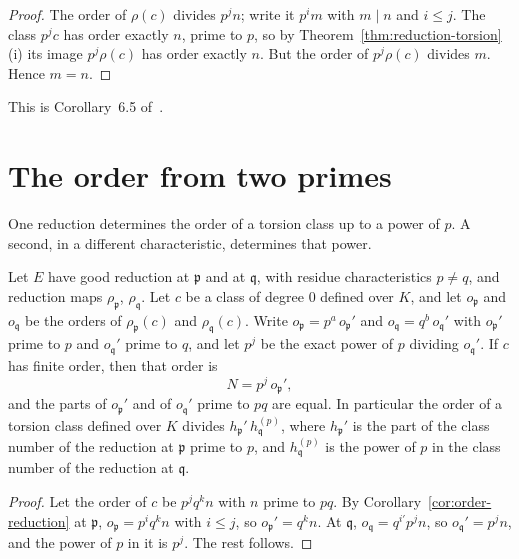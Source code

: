 \begin{proof}
The order of $\rho(c)$ divides $p^j n$; write it $p^i m$ with $m \mid n$ and
$i \le j$. The class $p^j c$ has order exactly $n$, prime to $p$, so by
Theorem~\ref{thm:reduction-torsion}(i) its image $p^j \rho(c)$ has order
exactly $n$. But the order of $p^j \rho(c)$ divides $m$. Hence $m = n$.
\end{proof}

This is Corollary~6.5 of~\cite{trager1984}.

\section{The order from two primes}\label{sec:fo-two-primes}

One reduction determines the order of a torsion class up to a power of $p$.
A second, in a different characteristic, determines that power.

\begin{theorem}\label{thm:two-primes}
Let $E$ have good reduction at $\mathfrak p$ and at $\mathfrak q$, with
residue characteristics $p \ne q$, and reduction maps $\rho_{\mathfrak p}$,
$\rho_{\mathfrak q}$. Let $c$ be a class of degree $0$ defined over $K$, and
let $o_{\mathfrak p}$ and $o_{\mathfrak q}$ be the orders of $\rho_{\mathfrak
p}(c)$ and $\rho_{\mathfrak q}(c)$. Write $o_{\mathfrak p} = p^a\,
o_{\mathfrak p}'$ and $o_{\mathfrak q} = q^b\, o_{\mathfrak q}'$ with
$o_{\mathfrak p}'$ prime to $p$ and $o_{\mathfrak q}'$ prime to $q$, and let
$p^{j}$ be the exact power of $p$ dividing $o_{\mathfrak q}'$. If $c$ has
finite order, then that order is
\[
  N = p^{j}\, o_{\mathfrak p}' ,
\]
and the parts of $o_{\mathfrak p}'$ and of $o_{\mathfrak q}'$ prime to $p q$
are equal. In particular the order of a torsion class defined over $K$
divides $h_{\mathfrak p}'\, h_{\mathfrak q}^{(p)}$, where $h_{\mathfrak p}'$
is the part of the class number of the reduction at $\mathfrak p$ prime to
$p$, and $h_{\mathfrak q}^{(p)}$ is the power of $p$ in the class number of
the reduction at $\mathfrak q$.
\end{theorem}

\begin{proof}
Let the order of $c$ be $p^j q^k n$ with $n$ prime to $p q$. By
Corollary~\ref{cor:order-reduction} at $\mathfrak p$, $o_{\mathfrak p} = p^i
q^k n$ with $i \le j$, so $o_{\mathfrak p}' = q^k n$. At $\mathfrak q$,
$o_{\mathfrak q} = q^{i'} p^j n$, so $o_{\mathfrak q}' = p^j n$, and the power
of $p$ in it is $p^j$. The rest follows.
\end{proof}

